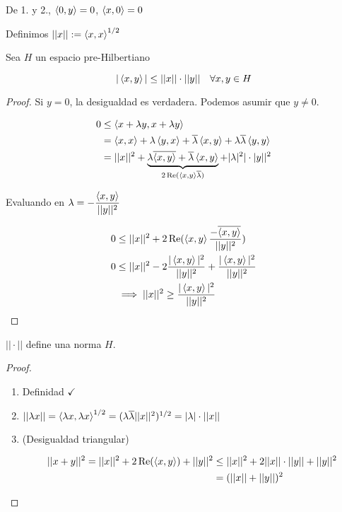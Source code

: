 De 1. y 2., $\left\langle 0,y\right\rangle=0$, $\left\langle x,0\right\rangle=0$

Definimos $||x||:=\left\langle x,x\right\rangle^{1/2}$

\begin{fproposition}
    Sea $H$ un espacio pre-Hilbertiano

    \[|\left\langle x,y\right\rangle|\leq ||x||\cdot ||y||\quad \forall x,y\in H\]
\end{fproposition}

\begin{proof}
    Si $y=0$, la desigualdad es verdadera. Podemos asumir que $y\neq 0$.

    \begin{align*}
        0&\leq \left\langle x+\lambda y,x+\lambda y\right\rangle\\
        &=\left\langle x,x\right\rangle+\lambda\left\langle y,x\right\rangle+\overline{\lambda}\left\langle x,y\right\rangle+\lambda \overline{\lambda}\left\langle y,y\right\rangle\\
        &=||x||^2 +\underbrace{\lambda \overline{\left\langle x,y\right\rangle}+\overline{\lambda}\left\langle x,y\right\rangle}_{2\operatorname{Re} (\left\langle x,y\right\rangle\overline{\lambda})}+|\lambda|^2|\cdot |y||^2
    \end{align*}

    Evaluando en $\lambda=-\dfrac{\left\langle x,y\right\rangle}{||y||^2}$

    \begin{align*}
        0&\leq ||x||^2+2\operatorname{Re} (\left\langle x,y\right\rangle\frac{-\overline{\left\langle x,y\right\rangle}}{||y||^2})\\
        0&\leq ||x||^2-2\frac{|\left\langle x,y\right\rangle|^2}{||y||^2}+\frac{|\left\langle x,y\right\rangle|^2}{||y||^2}\\
        &\implies ||x||^2\geq \frac{|\left\langle x,y\right\rangle|^2}{||y||^2}
    \end{align*}
\end{proof}

\begin{fproposition}
    $||\cdot||$ define una norma $H$.
\end{fproposition}
\begin{proof}
    \begin{enumerate}
        \item Definidad $\checkmark$
        \item $||\lambda x||=\left\langle \lambda x,\lambda x\right\rangle^{1/2}=(\lambda \overline{\lambda}||x||^2)^{1/2}=|\lambda|\cdot ||x||$
        \item (Desigualdad triangular)
        
        \begin{align*}
            ||x+y||^2=||x||^2+2\operatorname{Re} (\left\langle x,y\right\rangle)+||y||^2&\leq ||x||^2+2||x||\cdot ||y||+||y||^2\\
            &=(||x||+||y||)^2
        \end{align*}
    \end{enumerate}
\end{proof}

